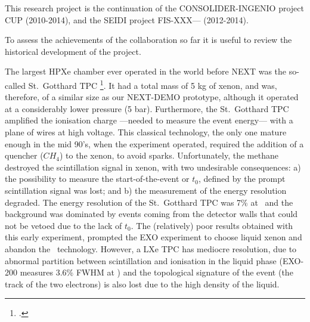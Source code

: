 
%

This research project is the continuation of the CONSOLIDER-INGENIO project CUP (2010-2014), and the SEIDI project FIS-XXX--- (2012-2014). 

To assess the achievements of the collaboration so far it is useful to review the historical development of the project. 

The largest HPXe chamber ever operated in the world before NEXT was the so-called St.~Gotthard TPC \footcite{Luscher:1998sd}. It had a total mass of 5 kg of xenon, and was, therefore, of a similar size as our NEXT-DEMO prototype, although it operated at a considerably lower pressure (5 bar). Furthermore, the St.~Gotthard TPC amplified the ionisation charge ---needed to measure the event energy--- with a plane of wires at high voltage. This classical technology, the only one mature enough in the mid 90's, when the experiment operated, required the addition of a quencher ($CH_4$) to the xenon, to avoid sparks. Unfortunately, the methane destroyed the scintillation signal in xenon, with two undesirable consequences: a) the possibility to measure the start-of-the-event or $t_0$, defined by the prompt scintillation signal was lost; and b) the measurement of the energy resolution degraded. The energy resolution of the St.~Gotthard TPC was 7\% at \Qbb\ and the background was dominated by events coming from the detector walls that could not be vetoed due to the lack of $t_0$. The (relatively) poor results obtained with this early experiment, prompted the EXO experiment to choose liquid xenon and abandon the \HPXE\ technology. However, a LXe TPC has mediocre resolution, due to abnormal partition between scintillation and ionisation in the liquid phase (EXO-200 measures 3.6\% FWHM at \Qbb) and the topological signature of the event (the track of the two electrons) is also lost due to the high density of the liquid. 

